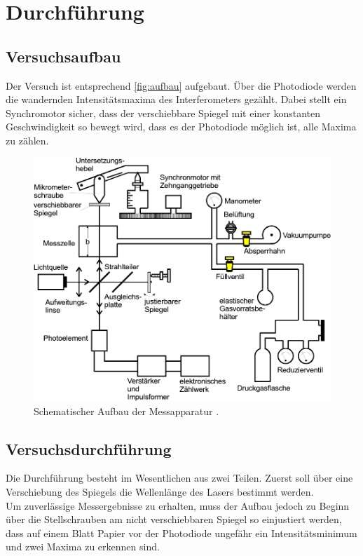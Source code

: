 \section{Durchführung}
\label{sec:Durchführung}


\subsection{Versuchsaufbau}

Der Versuch ist entsprechend \autoref{fig:aufbau} aufgebaut.
Über die Photodiode werden die wandernden Intensitätsmaxima des Interferometers gezählt.
Dabei stellt ein Synchromotor sicher, dass der verschiebbare Spiegel mit einer konstanten Geschwindigkeit so bewegt wird, dass es der Photodiode möglich ist, alle Maxima zu zählen.

\begin{figure}[H]
    \centering
    \includegraphics[width = .75\textwidth]{figures/Aufbau.pdf}
    \caption{Schematischer Aufbau der Messapparatur \cite{ap11}.}
    \label{fig:aufbau}
\end{figure}


\subsection{Versuchsdurchführung}

Die Durchführung besteht im Wesentlichen aus zwei Teilen.
Zuerst soll über eine Verschiebung des Spiegels die Wellenlänge des Lasers bestimmt werden. \\

Um zuverlässige Messergebnisse zu erhalten, muss der Aufbau jedoch zu Beginn über die Stellschrauben am nicht verschiebbaren Spiegel so einjustiert werden, 
dass auf einem Blatt Papier vor der Photodiode ungefähr ein Intensitätsminimum und zwei Maxima zu erkennen sind.\\

